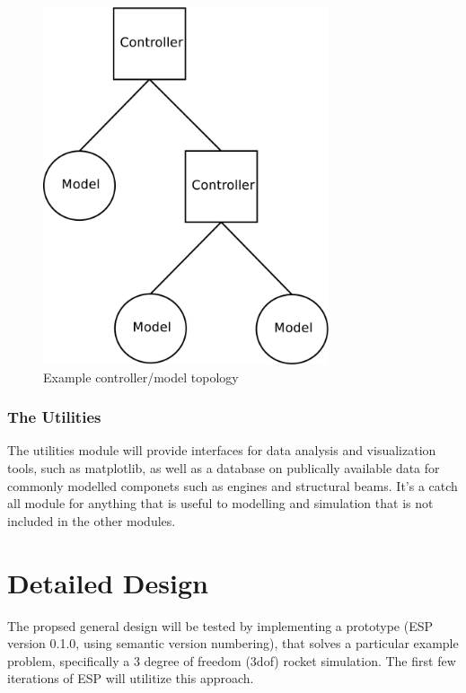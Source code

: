\documentclass{book}
\begin{document}
\begin{figure}
\centering
\leavevmode
\includegraphics[width=0.75\textwidth]{example_controller_layout.pdf}
\caption{Example controller/model topology}
\label{example_controller_model_topology}
\end{figure}

\subsection{The Utilities}
The utilities module will provide interfaces for data analysis and visualization tools, such as matplotlib, as well as a database on publically available data for commonly modelled componets such as engines and structural beams. It's a catch all module for anything that is useful to modelling and simulation that is not included in the other modules.

\chapter{Detailed Design}
The propsed general design will be tested by implementing a prototype (ESP version 0.1.0, using semantic version numbering), that solves a particular example problem, specifically a 3 degree of freedom (3dof) rocket simulation. The first few iterations of ESP will utilitize this approach.
\end{document}
